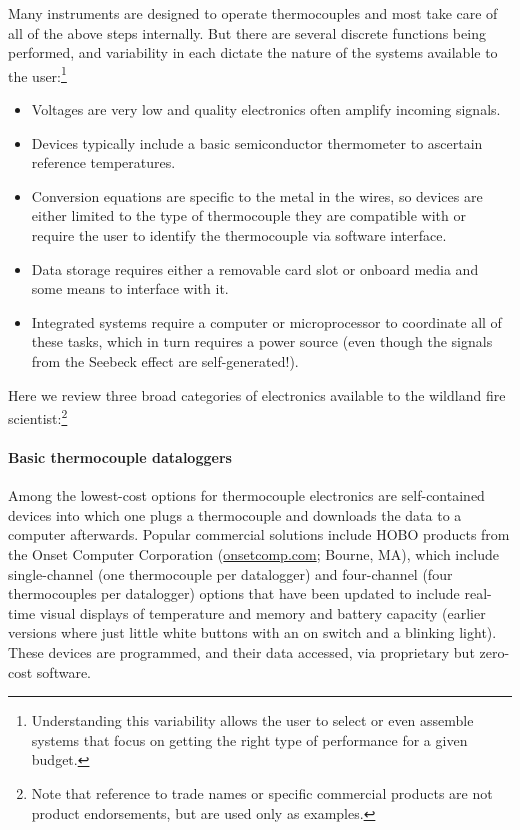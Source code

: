 Many instruments are designed to operate thermocouples and most take care of all of the above steps internally. 
But there are several discrete functions being performed, and variability in each dictate the nature of the systems available to the user:\footnote{Understanding this variability allows the user to select or even assemble systems that focus on getting the right type of performance for a given budget.}
 \begin{itemize}[noitemsep]
	\item Voltages are very low and quality electronics often amplify incoming signals.
	\item Devices typically include a basic semiconductor thermometer to ascertain reference temperatures.
	\item Conversion equations are specific to the metal in the wires, so devices are either limited to the type of thermocouple they are compatible with or require the user to identify the thermocouple via software interface.
	\item Data storage requires either a removable card slot or onboard media and some means to interface with it. 
	\item Integrated systems require a computer or microprocessor to coordinate all of these tasks, which in turn requires a power source (even though the signals from the Seebeck effect are self-generated!). 
\end{itemize}

Here we review three broad categories of electronics available to the wildland fire scientist:\footnote{
	Note that reference to trade names or specific commercial products are not product endorsements, but are used only as examples.}

\paragraph{Basic thermocouple dataloggers} 

Among the lowest-cost options for thermocouple electronics are self-contained devices into which one plugs a thermocouple and downloads the data to a computer afterwards. 
Popular commercial solutions include HOBO\textregistered{} products from the Onset Computer Corporation (\href{www.onsetcomp.com}{onsetcomp.com}; Bourne, MA), which include single-channel (one thermocouple per datalogger) and four-channel (four thermocouples per datalogger) options that have been updated to include real-time visual displays of temperature and memory and battery capacity (earlier versions where just little white buttons with an on switch and a blinking light). 
These devices are programmed, and their data accessed, via proprietary but zero-cost software. 

